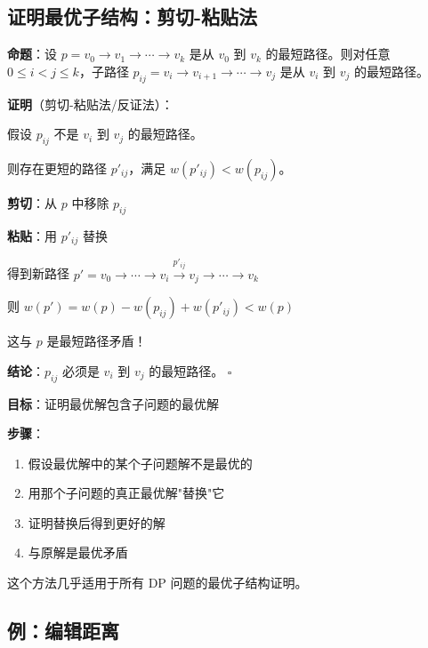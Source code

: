 \documentclass[12pt, a4paper]{ctexart}
\begin{document}
\subsection{证明最优子结构：剪切-粘贴法}

\begin{blackboard}[最短路径的最优子结构证明]

\textbf{命题}：设 $p = v_0 \to v_1 \to \cdots \to v_k$ 是从 $v_0$ 到 $v_k$ 的最短路径。则对任意 $0 \leq i < j \leq k$，子路径 $p_{ij} = v_i \to v_{i+1} \to \cdots \to v_j$ 是从 $v_i$ 到 $v_j$ 的最短路径。

\textbf{证明}（剪切-粘贴法/反证法）：

假设 $p_{ij}$ 不是 $v_i$ 到 $v_j$ 的最短路径。

则存在更短的路径 $p'_{ij}$，满足 $w(p'_{ij}) < w(p_{ij})$。

\textbf{剪切}：从 $p$ 中移除 $p_{ij}$

\textbf{粘贴}：用 $p'_{ij}$ 替换

得到新路径 $p' = v_0 \to \cdots \to v_i \xrightarrow{p'_{ij}} v_j \to \cdots \to v_k$

则 $w(p') = w(p) - w(p_{ij}) + w(p'_{ij}) < w(p)$

这与 $p$ 是最短路径矛盾！

\textbf{结论}：$p_{ij}$ 必须是 $v_i$ 到 $v_j$ 的最短路径。 $\square$

\end{blackboard}

\begin{insight}[剪切-粘贴法的通用模式]

\textbf{目标}：证明最优解包含子问题的最优解

\textbf{步骤}：
\begin{enumerate}
    \item 假设最优解中的某个子问题解不是最优的
    \item 用那个子问题的真正最优解"替换"它
    \item 证明替换后得到更好的解
    \item 与原解是最优矛盾
\end{enumerate}

这个方法几乎适用于所有 DP 问题的最优子结构证明。
\end{insight}

\subsection{例：编辑距离}
\end{document}
